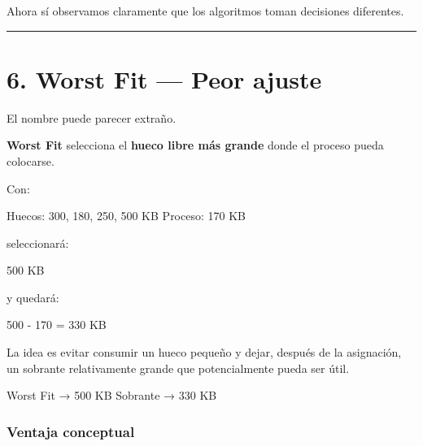\documentclass[
  spanish,
  letterpaper,
]{scrbook}
\newenvironment{Shaded}{\begin{snugshade}}{\end{snugshade}}
\newcommand{\NormalTok}[1]{\textcolor[rgb]{0.00,0.23,0.31}{#1}}
\begin{document}
Ahora sí observamos claramente que los algoritmos toman decisiones
diferentes.

\begin{center}\rule{0.5\linewidth}{0.5pt}\end{center}


\chapter{6. Worst Fit --- Peor ajuste}\label{worst-fit-peor-ajuste-1}

El nombre puede parecer extraño.

\textbf{Worst Fit} selecciona el \textbf{hueco libre más grande} donde
el proceso pueda colocarse.

Con:

\begin{Shaded}
\begin{Highlighting}[]
\NormalTok{Huecos: 300, 180, 250, 500 KB}
\NormalTok{Proceso: 170 KB}
\end{Highlighting}
\end{Shaded}

seleccionará:

\begin{Shaded}
\begin{Highlighting}[]
\NormalTok{500 KB}
\end{Highlighting}
\end{Shaded}

y quedará:

\begin{Shaded}
\begin{Highlighting}[]
\NormalTok{500 {-} 170 = 330 KB}
\end{Highlighting}
\end{Shaded}

La idea es evitar consumir un hueco pequeño y dejar, después de la
asignación, un sobrante relativamente grande que potencialmente pueda
ser útil.

\begin{Shaded}
\begin{Highlighting}[]
\NormalTok{Worst Fit → 500 KB}
\NormalTok{Sobrante  → 330 KB}
\end{Highlighting}
\end{Shaded}

\subsection{Ventaja conceptual}\label{ventaja-conceptual-3}
\end{document}
